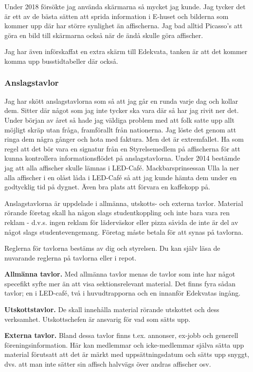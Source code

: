 \documentclass[10pt]{article}
\begin{document}
Under 2018 försökte jag använda skärmarna så mycket jag kunde. Jag tycker det är ett av de bästa sätten att sprida information i E-huset och bilderna som kommer upp där har större synlighet än affischerna.
Jag bad alltid Picasso's att göra en bild till skärmarna också när de ändå skulle göra affischer. 

Jag har även införskaffat en extra skärm till Edekvata, tanken är att det kommer komma upp busstidtabeller där också. 
\newpage
\subsubsection{Anslagstavlor}
Jag har skött anslagstavlorna som så att jag går en runda varje dag och kollar dem. Sitter där något som jag inte tycker ska vara där så har jag rivit ner det. Under början av året så hade jag väldiga problem med att folk satte upp allt möjligt skräp utan fråga, framförallt från nationerna. Jag löste det genom att ringa dem några gånger och hota med faktura. Men det är extremfallet. Ha som regel att det bör vara en signatur från en Styrelsemedlem på affischerna för att kunna kontrollera informationsflödet på anslagstavlorna. Under 2014 bestämde jag att alla affischer skulle lämnas i LED-Café.  Mackbarsprinsessan Ulla la ner alla affischer i en olåst låda i LED-Café så att jag kunde hämta dem under en godtycklig tid på dygnet. Även bra plats att förvara en kaffekopp på.

Anslagstavlorna är uppdelade i allmänna, utskotts- och externa tavlor. Material rörande företag skall ha någon slags studentkoppling och inte bara vara ren reklam - d.v.s. ingen reklam för läderväskor eller pizza såvida de inte är del av något slags studentevengemang. Företag måste betala för att synas på tavlorna.

Reglerna för tavlorna bestäms av dig och styrelsen. Du kan själv läsa de nuvarande reglerna på tavlorna eller i repot.

\textbf{Allmänna tavlor.} Med allmänna tavlor menas de tavlor som inte har något specefikt syfte mer än att visa sektionsrelevant material. Det finns fyra sådan tavlor; en i LED-café, två i huvudtrapporna och en innanför Edekvatas ingång.

\textbf{Utskottstavlor.} De skall innehålla material rörande utskottet och dess verksamhet. Utskottschefen är ansvarig för vad som sätts upp.

\textbf{Externa tavlor.} Bland dessa tavlor finns t.ex. annonser, ex-jobb och generell föreningsinformation. Här kan medlemmar och icke-medlemmar själva sätta upp material förutsatt att det är märkt med uppsättningsdatum och sätts upp snyggt, dvs. att man inte sätter sin affisch halvvägs över andras affischer osv.
\end{document}
